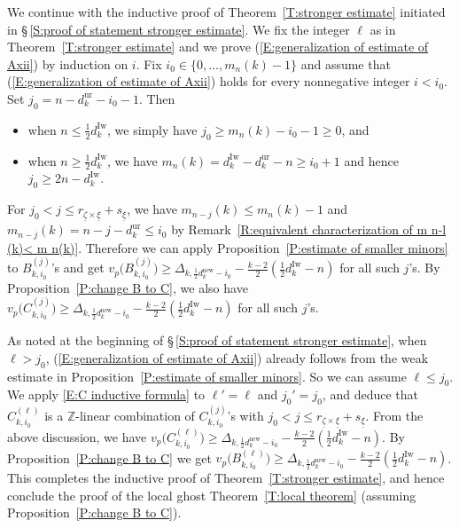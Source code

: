 \documentclass[12pt]{amsart}
\theoremstyle{definition}
\numberwithin{equation}{subsection}
\def\ZZ{\mathbb{Z}}
\newcommand{\new}{\mathrm{new}}
\newcommand{\Iw}{\mathrm{Iw}}
\newcommand{\ur}{\mathrm{ur}}
\begin{document}
We continue with the inductive proof of  Theorem~\ref{T:stronger estimate} initiated in \S\,\ref{S:proof of statement stronger estimate}. We fix the integer $\ell$ as in Theorem~\ref{T:stronger estimate} and we prove  (\ref{E:generalization of estimate of Axii}) by induction on $i$. Fix $i_0\in \{ 0,\dots, m_n(k)-1 \}$ and assume that (\ref{E:generalization of estimate of Axii}) holds for every nonnegative integer $i<i_0$. Set $j_0=n-d_k^\ur-i_0-1$. Then
\begin{itemize}
\item when $n \leq \frac 12d_k^\Iw$, we simply have $j_0\geq m_n(k)-i_0-1\geq 0$, and
\item when $n\geq \frac 12 d_k^\Iw$, we have 
$m_n(k)=d_k^\Iw-d_k^\ur-n\geq i_0+1$ and hence $j_0\geq 2n-d_k^\Iw$.
\end{itemize}
For $j_0<j\leq r_{\underline \zeta\times\underline\xi}+s_{\underline \xi}$, we have $m_{n-j}(k)\leq m_n(k)-1$ and $m_{n-j}(k)=n-j-d_k^\ur\leq i_0$ by Remark~\ref{R:equivalent characterization of m n-l (k)< m n(k)}. Therefore we can apply Proposition~\ref{P:estimate of smaller minors} to $B_{k,i_0}^{(j)}$'s and get 
$v_p\big(B_{k,i_0}^{(j)} \big)\geq \Delta_{k,\frac 12 d_k^\new-i_0}-\frac{k-2}2(\frac 12 d_k^\Iw-n)$ for all such $j$'s. By Proposition~\ref{P:change B to C}, we also have $v_p\big(C_{k,i_0}^{(j)} \big)\geq \Delta_{k,\frac 12 d_k^\new-i_0}-\frac{k-2}2(\frac 12 d_k^\Iw-n)$ for all such $j$'s.

As noted at the beginning of \S\,\ref{S:proof of statement stronger estimate}, when $\ell>j_0$, (\ref{E:generalization of estimate of Axii}) already follows from the weak estimate in Proposition~\ref{P:estimate of smaller minors}. So we can assume $\ell\leq j_0$. We apply \eqref{E:C inductive formula} to $\ell'=\ell$ and $j_0'=j_0$, and deduce that $C_{k,i_0}^{(\ell)}$ is a $\ZZ$-linear combination of $C_{k,i_0}^{(j)}$'s with $j_0<j\leq r_{\underline \zeta\times \underline \xi}+s_{\underline \xi}$. From the above discussion, we have $v_p\big(C_{k,i_0}^{(\ell)} \big)\geq \Delta_{k,\frac 12 d_k^\new-i_0}-\frac{k-2}2(\frac 12 d_k^\Iw-n)$. By Proposition~\ref{P:change B to C} we get $v_p\big(B_{k,i_0}^{(\ell)} \big)\geq \Delta_{k,\frac 12 d_k^\new-i_0}-\frac{k-2}2(\frac 12 d_k^\Iw-n)$. This completes the inductive proof of Theorem~\ref{T:stronger estimate}, and hence conclude the proof of the local ghost Theorem~\ref{T:local theorem} (assuming Proposition~\ref{P:change B to C}).
\end{document}
